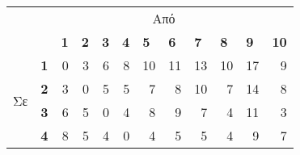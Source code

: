 \documentclass[12pt, a4paper]{article}
\begin{document}
\begin{table}[H]
\centering
\label{my-label}
\begin{tabular}{clrrrrrrrrrr}
\multicolumn{1}{l}{} & \multicolumn{11}{c}{Από}                                                                                                                                                                                                                                                                                                                                                   \\
\multicolumn{1}{l}{} &                                  & \multicolumn{1}{l}{\textbf{1}} & \multicolumn{1}{l}{\textbf{2}} & \multicolumn{1}{l}{\textbf{3}} & \multicolumn{1}{l}{\textbf{4}} & \multicolumn{1}{l}{\textbf{5}} & \multicolumn{1}{l}{\textbf{6}} & \multicolumn{1}{l}{\textbf{7}} & \multicolumn{1}{l}{\textbf{8}} & \multicolumn{1}{l}{\textbf{9}} & \multicolumn{1}{l}{\textbf{10}} \\ \cline{3-12} 
\multirow{10}{*}{Σε} & \multicolumn{1}{l|}{\textbf{1}}  & \multicolumn{1}{r|}{0}         & \multicolumn{1}{r|}{3}         & \multicolumn{1}{r|}{6}         & \multicolumn{1}{r|}{8}         & \multicolumn{1}{r|}{10}        & \multicolumn{1}{r|}{11}        & \multicolumn{1}{r|}{13}        & \multicolumn{1}{r|}{10}        & \multicolumn{1}{r|}{17}        & \multicolumn{1}{r|}{9}          \\ \cline{3-12} 
                     & \multicolumn{1}{l|}{\textbf{2}}  & \multicolumn{1}{r|}{3}         & \multicolumn{1}{r|}{0}         & \multicolumn{1}{r|}{5}         & \multicolumn{1}{r|}{5}         & \multicolumn{1}{r|}{7}         & \multicolumn{1}{r|}{8}         & \multicolumn{1}{r|}{10}        & \multicolumn{1}{r|}{7}         & \multicolumn{1}{r|}{14}        & \multicolumn{1}{r|}{8}          \\ \cline{3-12} 
                     & \multicolumn{1}{l|}{\textbf{3}}  & \multicolumn{1}{r|}{6}         & \multicolumn{1}{r|}{5}         & \multicolumn{1}{r|}{0}         & \multicolumn{1}{r|}{4}         & \multicolumn{1}{r|}{8}         & \multicolumn{1}{r|}{9}         & \multicolumn{1}{r|}{7}         & \multicolumn{1}{r|}{4}         & \multicolumn{1}{r|}{11}        & \multicolumn{1}{r|}{3}          \\ \cline{3-12} 
                     & \multicolumn{1}{l|}{\textbf{4}}  & \multicolumn{1}{r|}{8}         & \multicolumn{1}{r|}{5}         & \multicolumn{1}{r|}{4}         & \multicolumn{1}{r|}{0}         & \multicolumn{1}{r|}{4}         & \multicolumn{1}{r|}{5}         & \multicolumn{1}{r|}{5}         & \multicolumn{1}{r|}{4}         & \multicolumn{1}{r|}{9}         & \multicolumn{1}{r|}{7}          \\ \cline{3-12} 

\end{tabular}
\end{table}
\end{document}
